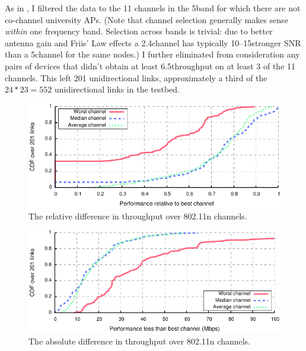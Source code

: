 As in , I filtered the data to the 11 channels in the 5\GHz band for which there are not co-channel university APs. (Note that channel selection generally makes sense \emph{within} one frequency band. Selection across bands is trivial: due to better antenna gain and Friis' Law effects a 2.4\GHz channel has typically 10\dB--15\dB stronger SNR than a 5\GHz channel for the same nodes.) I further eliminated from consideration any pairs of devices that didn't obtain at least 6.5\Mbps throughput on at least 3 of the 11 channels. This left 201 unidirectional links, approximately a third of the $24*23=552$ unidirectional links in the testbed.

\begin{figure}[t]
	\centering
	\includegraphics[width=\textwidth]{figures/applications/chan_sel_rel_diff.pdf}
	\caption[The relative difference in throughput over 802.11n channels]{\label{fig:chan_sel_rel_diff}The relative difference in throughput over 802.11n channels.}
\end{figure}

\begin{figure}[t]
	\centering
	\includegraphics[width=\textwidth]{figures/applications/chan_sel_tpt_diff.pdf}
	\caption[The absolute difference in throughput over 802.11n channels]{\label{fig:chan_sel_tpt_diff}The absolute difference in throughput over 802.11n channels.}
\end{figure}

